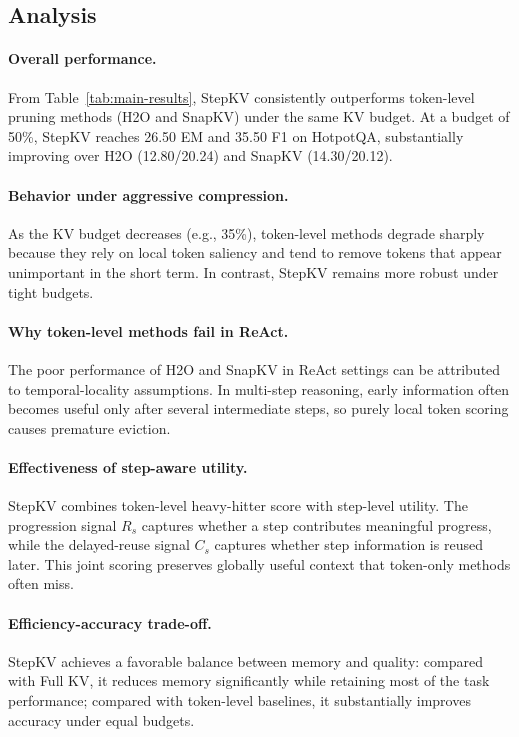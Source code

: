 \documentclass[11pt]{article}
\begin{document}
\subsection{Analysis}

\paragraph{Overall performance.}
From Table~\ref{tab:main-results}, StepKV consistently outperforms token-level pruning methods (H2O and SnapKV) under the same KV budget. At a budget of 50\%, StepKV reaches 26.50 EM and 35.50 F1 on HotpotQA, substantially improving over H2O (12.80/20.24) and SnapKV (14.30/20.12).

\paragraph{Behavior under aggressive compression.}
As the KV budget decreases (e.g., 35\%), token-level methods degrade sharply because they rely on local token saliency and tend to remove tokens that appear unimportant in the short term. In contrast, StepKV remains more robust under tight budgets.

\paragraph{Why token-level methods fail in ReAct.}
The poor performance of H2O and SnapKV in ReAct settings can be attributed to temporal-locality assumptions. In multi-step reasoning, early information often becomes useful only after several intermediate steps, so purely local token scoring causes premature eviction.

\paragraph{Effectiveness of step-aware utility.}
StepKV combines token-level heavy-hitter score with step-level utility. The progression signal $R_s$ captures whether a step contributes meaningful progress, while the delayed-reuse signal $C_s$ captures whether step information is reused later. This joint scoring preserves globally useful context that token-only methods often miss.

\paragraph{Efficiency-accuracy trade-off.}
StepKV achieves a favorable balance between memory and quality: compared with Full KV, it reduces memory significantly while retaining most of the task performance; compared with token-level baselines, it substantially improves accuracy under equal budgets.
\end{document}
